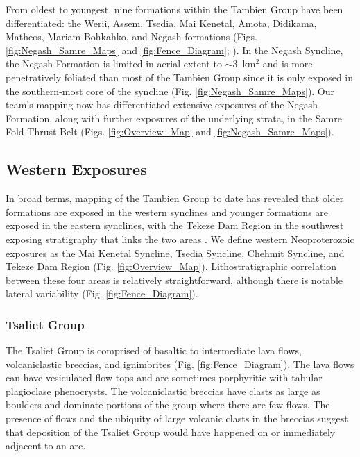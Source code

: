 \documentclass[11pt,letterpaper]{article}
\begin{document}
From oldest to youngest, nine formations within the Tambien Group have been differentiated: the Werii, Assem, Tsedia, Mai Kenetal, Amota, Didikama, Matheos, Mariam Bohkahko, and Negash formations (Figs. \ref{fig:Negash_Samre_Maps} and \ref{fig:Fence_Diagram}; \citealp{Swanson-Hysell2015a}). In the Negash Syncline, the Negash Formation is limited in aerial extent to $\sim$3~km$^{2}$ and is more penetratively foliated than most of the Tambien Group since it is only exposed in the southern-most core of the syncline (Fig. \ref{fig:Negash_Samre_Maps}). Our team's mapping now has differentiated extensive exposures of the Negash Formation, along with further exposures of the underlying strata, in the Samre Fold-Thrust Belt (Figs. \ref{fig:Overview_Map} and \ref{fig:Negash_Samre_Maps}).

\clearpage

\subsection*{Western Exposures \label{sec:WesternExposures}}

In broad terms, mapping of the Tambien Group to date has revealed that older formations are exposed in the western synclines and younger formations are exposed in the eastern synclines, with the Tekeze Dam Region in the southwest exposing stratigraphy that links the two areas \citep{Swanson-Hysell2015a}. We define western Neoproterozoic exposures as the Mai Kenetal Syncline, Tsedia Syncline, Chehmit Syncline, and Tekeze Dam Region (Fig. \ref{fig:Overview_Map}). Lithostratigraphic correlation between these four areas is relatively straightforward, although there is notable lateral variability (Fig. \ref{fig:Fence_Diagram}).

\subsubsection*{Tsaliet Group}

The Tsaliet Group is comprised of basaltic to intermediate lava flows, volcaniclastic breccias, and ignimbrites (Fig. \ref{fig:Fence_Diagram}). The lava flows can have vesiculated flow tops and are sometimes porphyritic with tabular plagioclase phenocrysts. The volcaniclastic breccias have clasts as large as boulders and dominate portions of the group where there are few flows. The presence of flows and the ubiquity of large volcanic clasts in the breccias suggest that deposition of the Tsaliet Group would have happened on or immediately adjacent to an arc.
\end{document}
